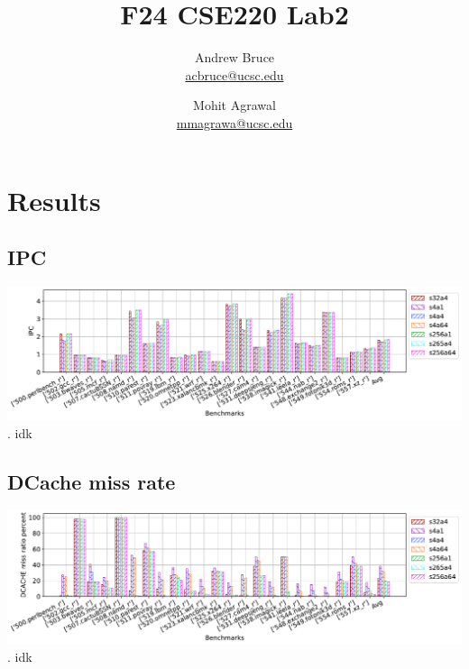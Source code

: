 \documentclass{article}
\title{F24 CSE220 Lab2}
\author{
  Andrew Bruce \\ \href{mailto:acbruce@ucsc.edu}{acbruce@ucsc.edu} \and
  Mohit Agrawal \\ \href{mailto:mmagrawa@ucsc.edu}{mmagrawa@ucsc.edu}
}
\begin{document}
\maketitle

\section*{Results}
\subsection*{IPC}
\includegraphics[width=\textwidth]{Part1/IPC.pdf}.
idk
\subsection*{DCache miss rate}
\includegraphics[width=\textwidth]{Part1/DCACHE.pdf}.
idk
\end{document}
